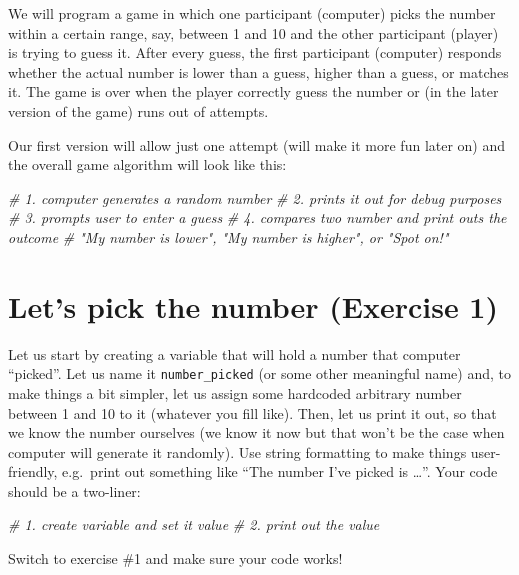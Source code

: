 \documentclass[
]{book}
\newenvironment{Shaded}{\begin{snugshade}}{\end{snugshade}}
\newcommand{\CommentTok}[1]{\textcolor[rgb]{0.56,0.35,0.01}{\textit{#1}}}
\begin{document}
We will program a game in which one participant (computer) picks the number within a certain range, say, between 1 and 10 and the other participant (player) is trying to guess it. After every guess, the first participant (computer) responds whether the actual number is lower than a guess, higher than a guess, or matches it. The game is over when the player correctly guess the number or (in the later version of the game) runs out of attempts.

Our first version will allow just one attempt (will make it more fun later on) and the overall game algorithm will look like this:

\begin{Shaded}
\begin{Highlighting}[]
\CommentTok{\# 1. computer generates a random number}
\CommentTok{\# 2. prints it out for debug purposes}
\CommentTok{\# 3. prompts user to enter a guess}
\CommentTok{\# 4. compares two number and print outs the outcome }
\CommentTok{\#    "My number is lower", "My number is higher", or "Spot on!"}
\end{Highlighting}
\end{Shaded}

\hypertarget{lets-pick-the-number-exercise-1}{%
\section{Let's pick the number (Exercise 1)}\label{lets-pick-the-number-exercise-1}}

Let us start by creating a variable that will hold a number that computer ``picked''. Let us name it \texttt{number\_picked} (or some other meaningful name) and, to make things a bit simpler, let us assign some hardcoded arbitrary number between 1 and 10 to it (whatever you fill like). Then, let us print it out, so that we know the number ourselves (we know it now but that won't be the case when computer will generate it randomly). Use string formatting to make things user-friendly, e.g.~print out something like ``The number I've picked is \ldots{}''. Your code should be a two-liner:

\begin{Shaded}
\begin{Highlighting}[]
\CommentTok{\# 1. create variable and set it value}
\CommentTok{\# 2. print out the value}
\end{Highlighting}
\end{Shaded}

Switch to exercise \#1 and make sure your code works!
\end{document}
